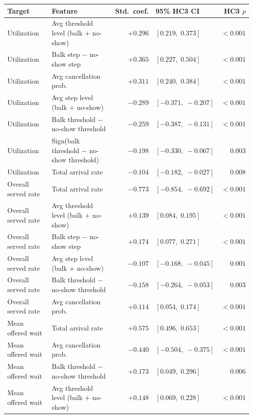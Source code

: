 \documentclass[11pt]{article}
\begin{document}
\begin{table}[H]
\centering
\small
\renewcommand{\arraystretch}{1.08}
\begin{tabular}{p{}p{}rp{}r}
\toprule
Target & Feature & Std.\ coef. & 95\% HC3 CI & HC3 $p$ \\
\midrule
Utilization & Avg threshold level (balk $+$ no-show) & $+0.296$ & $[0.219,\;0.373]$ & $<0.001$ \\
Utilization & Balk step $-$ no-show step & $+0.365$ & $[0.227,\;0.504]$ & $<0.001$ \\
Utilization & Avg cancellation prob. & $+0.311$ & $[0.240,\;0.384]$ & $<0.001$ \\
Utilization & Avg step level (balk $+$ no-show) & $-0.289$ & $[-0.371,\;-0.207]$ & $<0.001$ \\
Utilization & Balk threshold $-$ no-show threshold & $-0.259$ & $[-0.387,\;-0.131]$ & $<0.001$ \\
Utilization & Sign(balk threshold $-$ no-show threshold) & $-0.198$ & $[-0.330,\;-0.067]$ & $0.003$ \\
Utilization & Total arrival rate & $-0.104$ & $[-0.182,\;-0.027]$ & $0.008$ \\
\midrule
Overall served rate & Total arrival rate & $-0.773$ & $[-0.854,\;-0.692]$ & $<0.001$ \\
Overall served rate & Avg threshold level (balk $+$ no-show) & $+0.139$ & $[0.084,\;0.195]$ & $<0.001$ \\
Overall served rate & Balk step $-$ no-show step & $+0.174$ & $[0.077,\;0.271]$ & $<0.001$ \\
Overall served rate & Avg step level (balk $+$ no-show) & $-0.107$ & $[-0.168,\;-0.045]$ & $0.001$ \\
Overall served rate & Balk threshold $-$ no-show threshold & $-0.158$ & $[-0.264,\;-0.053]$ & $0.003$ \\
Overall served rate & Avg cancellation prob. & $+0.114$ & $[0.054,\;0.174]$ & $<0.001$ \\
\midrule
Mean offered wait & Total arrival rate & $+0.575$ & $[0.496,\;0.653]$ & $<0.001$ \\
Mean offered wait & Avg cancellation prob. & $-0.440$ & $[-0.504,\;-0.375]$ & $<0.001$ \\
Mean offered wait & Balk threshold $-$ no-show threshold & $+0.173$ & $[0.049,\;0.296]$ & $0.006$ \\
Mean offered wait & Avg threshold level (balk $+$ no-show) & $+0.148$ & $[0.069,\;0.228]$ & $<0.001$ \\

\end{tabular}
\end{table}
\end{document}
